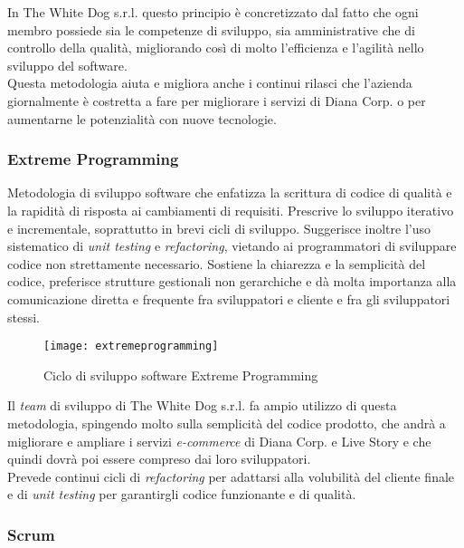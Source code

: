 In The White Dog s.r.l. questo principio è concretizzato dal fatto che ogni membro possiede sia le competenze di sviluppo, sia amministrative che di controllo della qualità, migliorando così di molto l'efficienza e l'agilità nello sviluppo del software. \\
Questa metodologia aiuta e migliora anche i continui rilasci che l'azienda giornalmente è costretta a fare per migliorare i servizi di Diana Corp. o per aumentarne le potenzialità con nuove tecnologie.

\subsubsection{Extreme Programming}

Metodologia di sviluppo software che enfatizza la scrittura di codice di qualità e la rapidità di risposta ai cambiamenti di requisiti. Prescrive lo sviluppo iterativo e incrementale, soprattutto in brevi cicli di sviluppo. Suggerisce inoltre l'uso sistematico di \textit{unit testing} e \textit{refactoring}, vietando ai programmatori di sviluppare codice non strettamente necessario. Sostiene la chiarezza e la semplicità del codice, preferisce strutture gestionali non gerarchiche e dà molta importanza alla comunicazione diretta e frequente fra sviluppatori e cliente e fra gli sviluppatori stessi. 

\label{Extreme Programming}
\begin{figure}[ht]
	\begin{center}
		\texttt{[image: extremeprogramming]}
		\caption{Ciclo di sviluppo software Extreme Programming}
	\end{center}
\end{figure}
\FloatBarrier

Il \textit{team} di sviluppo di The White Dog s.r.l. fa ampio utilizzo di questa metodologia, spingendo molto sulla semplicità del codice prodotto, che andrà a migliorare e ampliare i servizi \textit{e-commerce} di Diana Corp. e Live Story e che quindi dovrà poi essere compreso dai loro sviluppatori. \\
Prevede continui cicli di \textit{refactoring} per adattarsi alla volubilità del cliente finale e di \textit{unit testing} per garantirgli codice funzionante e di qualità.

\subsubsection{Scrum}

